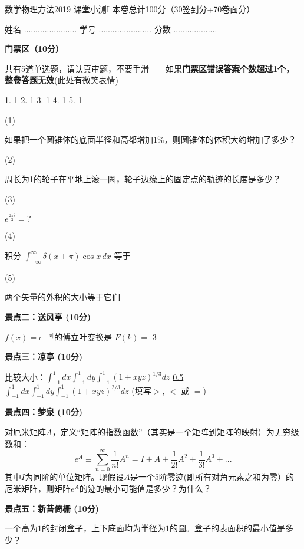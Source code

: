 \documentclass[10pt,CJK]{article}
\begin{document}
\bch
{\large 数学物理方法2019 课堂小测I 本卷总计100分（30签到分+70卷面分）}

{\vskip 0.05in}

姓名 ....................... {\hskip 0.5in}    学号 .......................{\hskip 0.5in}  分数 ...................

{\vskip 0.05in}

{\bf 门票区（10分）}

共有5道单选题，请认真审题，不要手滑——如果{\bf 门票区错误答案个数超过1个，整卷答题无效}(此处有微笑表情)

{\vskip 0.05in}

1. \uline{1} 2. \uline{1} 3. \uline{1} 4. \uline{1} 5. \uline{1}

{\vskip 0.02in}

  \bitem
\item[(1)]{如果把一个圆锥体的底面半径和高都增加$1\%$，则圆锥体的体积大约增加了多少？  
  
   }
\item[(2)]{周长为1的轮子在平地上滚一圈，轮子边缘上的固定点的轨迹的长度是多少？


 }
\item[(3)]{$e^{\frac{2\pi i}{3}}=?$  


 }
\item[(4)]{积分 $\int_{-\infty}^\infty  \delta(x+\pi) \cos x\, dx$ 等于

 }
\item[(5)]{两个矢量的外积的大小等于它们

 }
  \eitem
  
  {\vskip 0.02in}

  {\bf 景点二：送风亭 (10分)}
  
$f(x)=e^{-|x|}$的傅立叶变换是 $F(k)=$ \uline{3}  

{\vskip 0.02in}

{\bf 景点三：凉亭 (10分)}

比较大小：$\int_{-1}^1dx\int_{-1}^1dy\int_{-1}^1 (1+xyz)^{1/3}dz$ \uline{0.5} $\int_{-1}^1dx\int_{-1}^1dy\int_{-1}^1 (1+xyz)^{2/3}dz$ (填写$>$, $<$ 或 $=$)

{\vskip 0.02in}

{\bf 景点四：梦泉 (10分)}

对厄米矩阵$A$，定义“矩阵的指数函数”（其实是一个矩阵到矩阵的映射）为无穷级数和：
$$ e^A \equiv \sum_{n=0}^\infty \frac{1}{n!}A^n = I + A + \frac{1}{2!}A^2 + \frac{1}{3!}A^3+...$$
其中$I$为同阶的单位矩阵。现假设$A$是一个5阶零迹(即所有对角元素之和为零）的厄米矩阵，则矩阵$e^A$的迹的最小可能值是多少？为什么？
  

{\vskip 5in}


{\bf 景点五：新苔倚栅 (10分)}

一个高为$1$的封闭盒子，上下底面均为半径为$1$的圆。盒子的表面积的最小值是多少？

\ech
\end{document}
